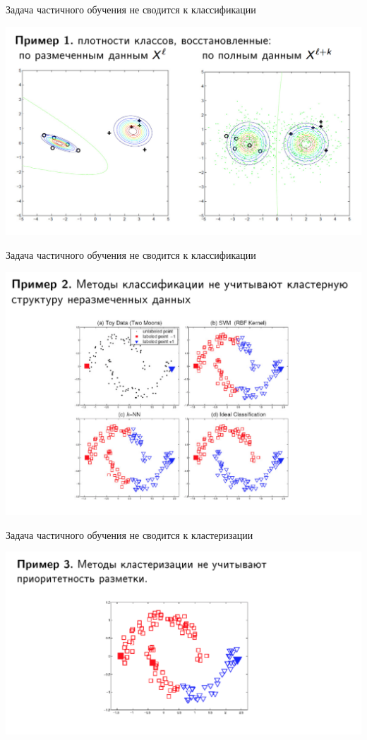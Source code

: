 \documentclass[notes,12pt, aspectratio=169]{beamer}
\begin{document}
\begin{frame}{Задача частичного обучения не сводится к классификации}
\begin{center}
	\includegraphics[width=.75\linewidth]{ex_1.png}
\end{center}
\end{frame}

\begin{frame}{Задача частичного обучения не сводится к классификации}
\begin{center}
	\includegraphics[width=.7\linewidth]{ex_2.png}
\end{center}
\end{frame}


\begin{frame}{Задача частичного обучения не сводится к кластеризации}
\begin{center}
	\includegraphics[width=.75\linewidth]{ex_3.png}
\end{center}
\end{frame}
\end{document}
